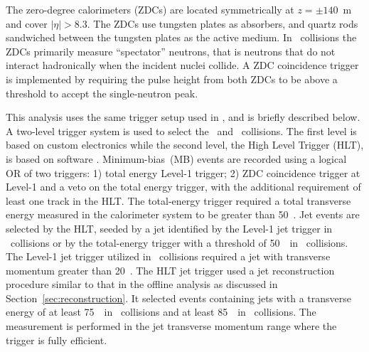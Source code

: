 The zero-degree calorimeters (ZDCs) are located symmetrically at $z = \pm140$~m and cover $|\eta| > 8.3$.
The ZDCs use tungsten plates as absorbers, and quartz rods sandwiched between the tungsten plates as the active medium. In \PbPb\ collisions the ZDCs primarily measure ``spectator'' neutrons, that is neutrons that do not interact
hadronically when the incident nuclei collide. A ZDC coincidence trigger is implemented by requiring
the pulse height from both ZDCs to be above a threshold to accept the single-neutron peak.

This analysis uses the same trigger setup used in \cite{Aaboud:2018hpb}, and is briefly described below. A two-level trigger system is used to select the \PbPb\ and \pp\ collisions. The first level is based on custom electronics while the second level, the High Level Trigger (HLT), is based on software \cite{Aaboud:2016leb}. 
Minimum-bias~(MB) events are recorded using a logical OR of two triggers: 1) total energy Level-1 trigger; 2) ZDC coincidence trigger at Level-1 and a veto on the total energy trigger, with the additional requirement of least one track in the HLT. The total-energy trigger required a total transverse energy measured in the calorimeter system to be greater than 50~\GeV.  Jet events are selected by the HLT, seeded by a jet identified by the Level-1 jet trigger in \pp\ collisions or by the total-energy trigger with a threshold of 50~\GeV\ in \PbPb\ collisions. The Level-1 jet trigger utilized in \pp\ collisions required a jet with transverse momentum greater than 20~\GeV.
The HLT jet trigger used a jet reconstruction procedure similar to that in the offline
analysis as discussed in Section~\ref{sec:reconstruction}. 
It selected events containing jets with a transverse energy 
of at least 75~\GeV\ in \PbPb\ collisions and at least 
85~\GeV\ in \pp\ collisions. The measurement is performed in the 
jet transverse momentum range where the trigger is fully efficient.






